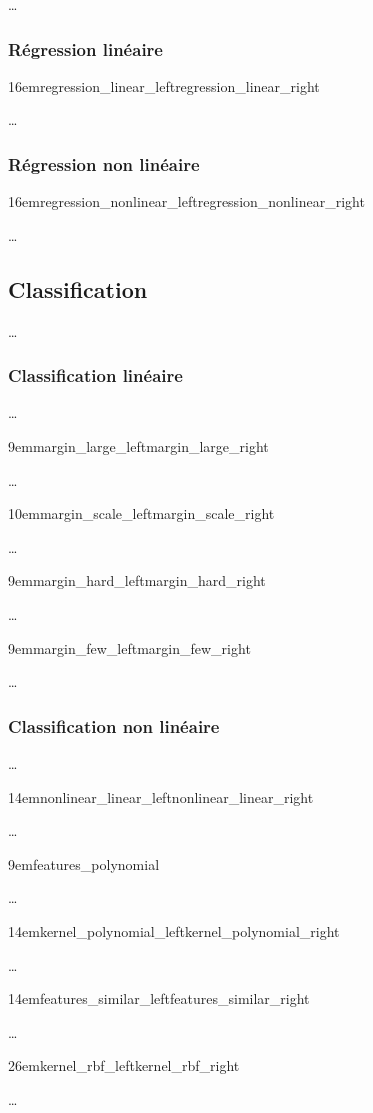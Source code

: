 …

\subsubsection{Régression linéaire}

{16em}{regression_linear_left}{regression_linear_right}

…

\subsubsection{Régression non linéaire}

{16em}{regression_nonlinear_left}{regression_nonlinear_right}

…

\subsection{Classification}

…

\subsubsection{Classification linéaire}

…

{9em}{margin_large_left}{margin_large_right}

…

{10em}{margin_scale_left}{margin_scale_right}

…

{9em}{margin_hard_left}{margin_hard_right}

…

{9em}{margin_few_left}{margin_few_right}

…

\subsubsection{Classification non linéaire}

…

{14em}{nonlinear_linear_left}{nonlinear_linear_right}

…

{9em}{features_polynomial}

…

{14em}{kernel_polynomial_left}{kernel_polynomial_right}

…

{14em}{features_similar_left}{features_similar_right}

…

{26em}{kernel_rbf_left}{kernel_rbf_right}

…

\cite{svm}

\pagebreak
